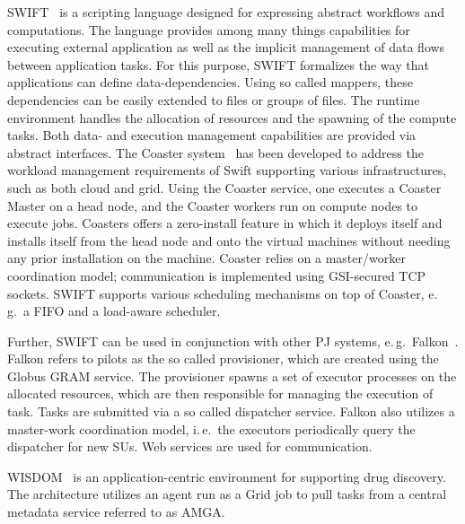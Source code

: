 \documentclass{sig-alternate}
\begin{document}
SWIFT~\cite{Wilde2011} is a scripting language designed for expressing
abstract workflows and computations. The language provides among many
things capabilities for executing external application as well as the
implicit management of data flows between application tasks. For this
purpose, SWIFT formalizes the way that applications can define
data-dependencies. Using so called mappers, these dependencies can be
easily extended to files or groups of files. The runtime environment
handles the allocation of resources and the spawning of the compute
tasks. Both data- and execution management capabilities are provided
via abstract interfaces. The Coaster system~\cite{coasters} has been
developed to address the workload management requirements of Swift
supporting various infrastructures, such as both cloud and grid. Using
the Coaster service, one executes a Coaster Master on a head node, and
the Coaster workers run on compute nodes to execute jobs.  Coasters
offers a zero-install feature in which it deploys itself and installs
itself from the head node and onto the virtual machines without
needing any prior installation on the machine. Coaster relies on a
master/worker coordination model; communication is implemented using
GSI-secured TCP sockets. SWIFT supports various scheduling mechanisms
on top of Coaster, e.\,g.\ a FIFO and a load-aware scheduler.

Further, SWIFT can be used in conjunction with other PJ systems,
e.\,g.\ Falkon~\cite{1362680}. Falkon refers to pilots as the so
called provisioner, which are created using the Globus GRAM
service. The provisioner spawns a set of executor processes on the
allocated resources, which are then responsible for managing the
execution of task. Tasks are submitted via a so called dispatcher
service. Falkon also utilizes a master-work coordination model,
i.\,e.\ the executors periodically query the dispatcher for new SUs.
Web services are used for communication.




WISDOM~\cite{Ahn:2008:ITR:1444448.1445115,wisdom} is an application-centric
environment for supporting drug discovery. The architecture utilizes an agent
run as a Grid job to pull tasks from a central metadata service referred to as
AMGA.
\end{document}
